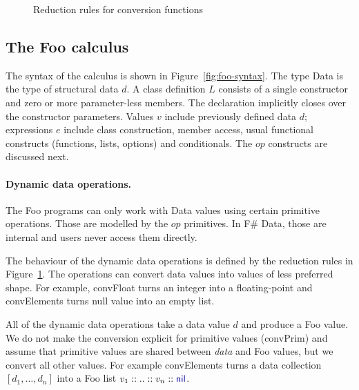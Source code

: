 \documentclass[10pt,preprint,clearpagebib]{sigplanconf}
\newcommand{\kvd}[1]{\textnormal{\textcolor{kvdclr}{\sffamily #1}}}
\newcommand{\num}[1]{\textnormal{\textcolor{numclr}{\sffamily #1}}}
\newcommand{\ident}[1]{\textnormal{\sffamily #1}}
\begin{document}
\begin{figure}
\caption{Reduction rules for conversion functions}
\label{fig:op-conversions}
\vspace{-0.5em}
\end{figure}


\subsection{The Foo calculus}
\label{sec:formal-ff}

The syntax of the calculus is shown in Figure~\ref{fig:foo-syntax}. 
The type \ident{Data} is the type of structural data $d$. A class definition $L$ consists of 
a single constructor and zero or more parameter-less members. The declaration implicitly closes
over the constructor parameters.
Values $v$ include previously defined data $d$; expressions
$e$ include class construction, member access, usual functional constructs (functions,
lists, options) and conditionals. The $op$ constructs are discussed next.


\paragraph{Dynamic data operations.}

The Foo programs can only work with \ident{Data} values using certain primitive operations. Those are modelled
by the $op$ primitives. In F\# Data, those are internal and users never access them directly.

The behaviour of the dynamic data operations is defined by the reduction rules in 
Figure~\ref{fig:op-conversions}. The operations can convert data values into values of 
less preferred shape. For example, \ident{convFloat} turns an integer \num{1} into 
a floating-point \num{1.0} and \ident{convElements} turns \kvd{null} value into an empty list.

All of the dynamic data operations take a data value $d$ and produce a Foo value. We do not 
make the conversion explicit for primitive values (\ident{convPrim}) and assume that primitive
values are shared between \emph{data} and Foo values, but we convert all other values. For example \ident{convElements} turns a 
data collection $[d_1, \ldots, d_n]$ into a Foo list $v_1 :: .. :: v_n :: \kvd{nil}$.
\end{document}
